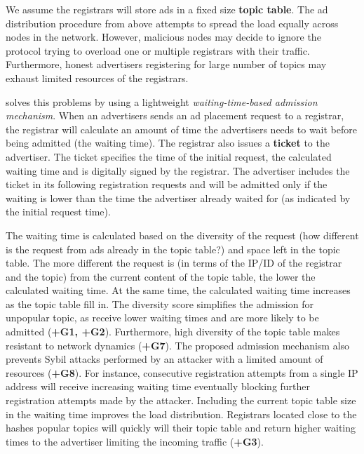   We assume the registrars will store ads in a fixed size \textbf{topic table}. The ad distribution procedure from above attempts to spread the load equally across nodes in the network. However, malicious nodes may decide to ignore the protocol trying to overload one or multiple registrars with their traffic. Furthermore, honest advertisers registering for large number of topics may exhaust limited resources of the registrars. 
 
 \sysname solves this problems by using a lightweight \textit{waiting-time-based admission mechanism}. When an advertisers sends an ad placement request to a registrar, the registrar will calculate an amount of time the advertisers needs to wait before being admitted (\ie the waiting time). The registrar also issues a \textbf{ticket} to the advertiser. The ticket specifies the time of the initial request, the calculated waiting time and is digitally signed by the registrar. The advertiser includes the ticket in its following registration requests and will be admitted only if the waiting is lower than the time the advertiser already waited for (as indicated by the initial request time). 
 
 The waiting time is calculated based on the diversity of the request (\ie how different is the request from ads already in the topic table?) and space left in the topic table. The more different the request is (in terms of the IP/ID of the registrar and the topic) from the current content of the topic table, the lower the calculated waiting time. At the same time, the calculated waiting time increases as the topic table fill in. The diversity score simplifies the admission for unpopular topic, as receive lower waiting times and are more likely to be admitted (\textbf{+G1, +G2}). Furthermore, high diversity of the topic table makes \sysname resistant to network dynamics (\textbf{+G7}). The proposed admission mechanism also prevents Sybil attacks performed by an attacker with a limited amount of resources (\textbf{+G8}). For instance, consecutive registration attempts from a single IP address will receive increasing waiting time eventually blocking further registration attempts made by the attacker. Including the current topic table size in the waiting time improves the load distribution. Registrars located close to the hashes popular topics will quickly will their topic table and return higher waiting times to the advertiser limiting the incoming traffic (\textbf{+G3}). 
